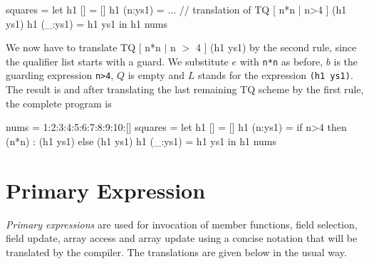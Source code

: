 \begin{code}
squares = let
   h1 [] = []
   h1 (n:ys1) = ... // translation of TQ [ n*n | n>4 ] (h1 ys1)
   h1 (_:ys1) = h1 ys1
 in h1 nums
\end{code}

We now have to translate TQ [ n*n $|$ n $>$ 4 ] (h1 ys1) by the second rule, since the qualifier list starts with a guard. We substitute $e$ with \texttt{n*n} as before, $b$ is the guarding expression \texttt{n>4}, $Q$ is empty and $L$ stands for the expression \texttt{(h1 ys1)}.
The result is 
and after translating the last remaining TQ scheme by the first rule, the complete program is

\begin{code}
nums = 1:2:3:4:5:6:7:8:9:10:[]
squares = let
   h1 [] = []
   h1 (n:ys1) = if n>4 then (n*n) : (h1 ys1) else (h1 ys1)
   h1 (_:ys1) = h1 ys1
 in h1 nums
\end{code}


\section{Primary Expression} \label{primexp} 

\emph{Primary expressions} are used for invocation of member functions, field selection, field update, array access and array update using a concise notation that will be translated by the compiler. The translations are given below in the usual way.

